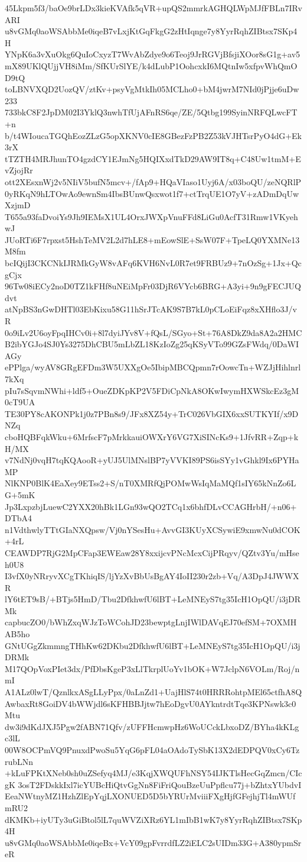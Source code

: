 45Lkpm5f3/baOe9brLDx3kieKVAfk5qVR+upQS2mmrkAGHQLWpMJfFBLn7IRvARI
u8vGMq0aoWSAbbMe0iqeB7vLxjKtGqFkgG2zHtIqnge7y8YyrRqhZIBtsx7SKp4H
YNpK6a3vXuOkg6QuIoCxyzT7WvAbZdye9o6Teoj9JrRGVjBfsjiXOor8sG1g+av5
mX89UKlQUjjVH8iMm/SfKUrSlYE/k4dLubP1OohcxkI6MQtnIw5xfpvWhQmOD9tQ
toLBNVXQD2UozQV/ztKv+psyVgMtkIh05MCLho0+bM4jwrM7NId0jPjje6uDw233
733bkC8F2JpDM02I3YklQ3nwhTfUjAFnRS6qe/ZE/5Qtbg199SyinNRFQLwcFT+n
b/t4WIoucaTGQhEozZLzG5opXKNV0cIE8GBezFzPB2Z53kVJHTsrPyO4dG+Ek3rX
tTZTH4MRJhunTO4gzdCY1EJmNg5HQIXxdTkD29AW9IT8q+C48Uw1tmM+EvZjojRr
ott2XEsxnWj2v5NIiV5bufN5mcv+/fAp9+HQaVIaso1Uyj6A/x03boQU/zeNQRlP
0yRKqN9hLTOwAo9ewnSm4IbsBUnwQsxwot1f7+ctTrqUE1O7yV+zADmDqUwXzjmD
T655a93faDvoiYs9Jh9IEMsX1UL4OrxJWXpVnuFFd8LiGu0AcfT31Rmw1VKyehwJ
JUoRTi6F7rpxst5HshTeMV2L2d7hLE8+mEowSlE+SsW07F+TpeLQ0YXMNe13M8fm
bcIQijI3CKCNkIJRMkGyW8vAFq6KVH6NvL0R7et9FRBUz9+7nOzSg+1Jx+QcgCjx
96Tw08iECy2noD0TZ1kFHf8uNEiMpFr03DjR6VYcb6BRG+A3yi+9n9gFECJUQdvt
atNpBS3nGwDHTl03EbKixu58G11hSrJTcAK9S7B7kL0pCLoEiFqz8xXHflo3J/vR
0o9iLv2U6oyFpqIHCv0i+8l7dyiJYv8V+fQsL/SGyo+St+76A8DkZ9da8A2a2HMC
B2ibYGJo4SJ0Ys3275DhCBU5mLbZL18KzIoZg25qKSyVTo99GZsFWdq/0DaWIAGy
ePPlga/wyAV8GRgEFDm3W5UXXgOe5IbipMBCQpmn7rOowcTn+WZJjHihlnrl7kXq
pIu7sSqvmNWhi+ldf5+OueZDKpKP2V5FDiCpNkA8OKwIwymHXWSkcEz3gM0cT9UA
TE30PY8cAKONPk1j0z7PBn8s9/JFx8XZ54y+TrC026VbGIX6xxSUTKYIf/x9DNZq
cboHQBFqkWku+6MrfscF7pMrkkauiOWXrY6VG7XiSINcKs9+1JfvRR+Zqp+kH/MX
v7NdNj0vqH7tqKQAooR+yUJ5UlMNslBP7yVVKI89PS6isSYy1vGhkl9Ix6PYHaMP
NlKNP0BlK4EaXey9ETss2+S/nT0XMRfQjPOMwWsIqMaMQf1sIY65kNnZo6LG+5mK
Jp3LxpzbjLuewC2YXX20hBk1LGn93wQO2TCq1x6bhfDLvCCAGHrbH/+n06+DTbA4
n1VdthwlyTTtGIaNXQpsw/Vj0nYSesHu+AvvGI3KUyXCSywiE9xmwNu0dCOK+4rL
CEAWDP7RjG2MpCFap3EWEaw28Y8xxijcvPNcMcxCijPRqyv/QZtv3Yu/mHseh0U8
I3vfX0yNRryvXCgTKhiqIS/ljYzXvBbUsBgAY4IoII230r2zb+Vq/A3DpJ4JWWXR
lY6tET9sB/+BTjs5HmD/Tbu2DfkhwfU6lBT+LeMNEyS7tg35IcH1OpQU/i3jDRMk
capbucZO0/bWhZxqWJzToWCohJD23bewptgLnjIWlDAVqEJ70efSM+7OXMHAB5ho
GNtUGgZkmmngTHhKw62DKbu2DfkhwfU6lBT+LeMNEyS7tg35IcH1OpQU/i3jDRMk
M17QOpVoxPIet3dx/PfDbsKgeP3xLlTkrplUoYv1bOK+W7JclpN6VOLm/Roj/nmI
A1ALz0lwT/QznlkxASgLLyPpx/0aLnZd1+UajHlS74t0HRRRohtpMEl65ctfhA8Q
AwbaxRt8GoiDV4bWWjdl6sKFHBBJjtw7hEoDgvU0AYkntrdtTqe3KPNswk3c0Mtu
dw3i9dKdJXJ5Pgw2fABN71Qfv/zUFFHcmwpHz6WoUCckLbxoDZ/BYha4kKLgc3lL
00W8OCPmVQ9PnuxdPwoSu5YqG6pFL04aOAdoTySbK13X2dEDPQV0xCy6TzrubLNn
+kLuFPKtXNeb0sh0uZSefyq4MJ/e3KqjXWQUFhNSY54IJKTlsHecGqZmcn/CIcgK
3osT2FDskkIxl7icYUBcHiQtvGgNn8FiFriQouBzeUuPpflcu77j+bZhtxYUbdvI
EeaNWtnyMZ1HzhZlEpYqjLXONUED5D5bYRUrMviiiFXgHjfGFejhjTl4mWUfmRU2
dKMKb+iyUTy3uGiBtol5lL7quWVZiXRz6YL1mIbB1wK7y8YyrRqhZIBtsx7SKp4H
u8vGMq0aoWSAbbMe0iqeBx+VcY09gpFvrrdfLZ2iELC2sUIDm33G+A380ypmSreR
